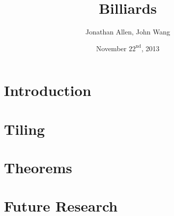 \documentclass{beamer}
\title{Billiards}
\author{Jonathan Allen, John Wang}
\institute[MIT]{Massachusetts Institute of Technology}
\date{November $22^\text{nd}$, 2013}
\begin{document}
\graphicspath{ {figures/} }

\frame{

\titlepage

}

\section{Introduction}



\section{Tiling}

\frame{
  \tableofcontents[currentsection]
}



\section{Theorems}

\frame{
  \tableofcontents[currentsection]
}





\section{Future Research}

\frame{
  \tableofcontents[currentsection]
}


\end{document}
